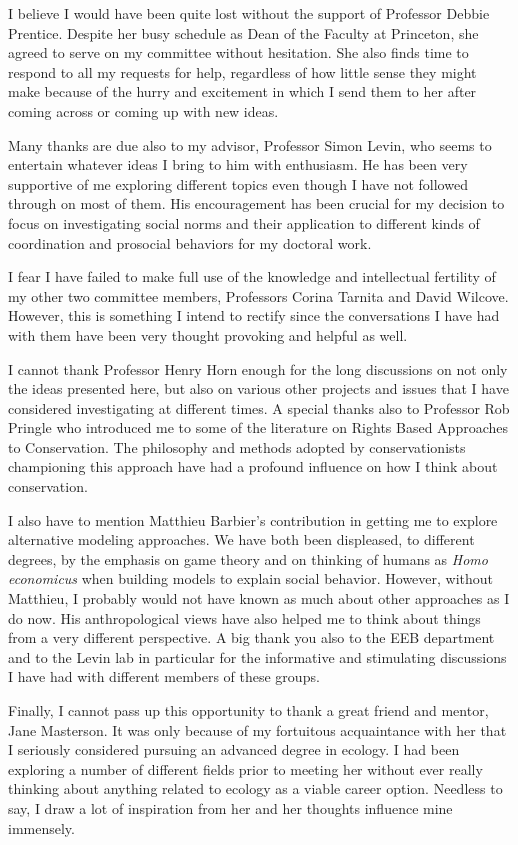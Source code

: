 \documentclass{report}
\begin{document}
I believe I would have been quite lost without the support of Professor Debbie Prentice. Despite her busy schedule as Dean of the Faculty at Princeton, she agreed to serve on my committee without hesitation. She also finds time to respond to all my requests for help, regardless of how little sense they might make because of the hurry and excitement in which I send them to her after coming across or coming up with new ideas.

Many thanks are due also to my advisor, Professor Simon Levin, who seems to entertain whatever ideas I bring to him with enthusiasm. He  has been very supportive of me exploring different topics even though I have not followed through on most of them. His encouragement has been crucial for my decision to focus on investigating social norms and their application to different kinds of coordination and prosocial behaviors for my doctoral work.

I fear I have failed to make full use of the knowledge and intellectual fertility of my other two committee members, Professors Corina Tarnita and David Wilcove. However, this is something I intend to rectify since the conversations I have had with them have been very thought provoking and helpful as well.

I cannot thank Professor Henry Horn enough for the long discussions on not only the ideas presented here, but also on various other projects and issues that I have considered investigating at different times. A special thanks also to Professor Rob Pringle who introduced me to some of the literature on Rights Based Approaches to Conservation. The philosophy and methods adopted by conservationists championing this approach have had a profound influence on how I think about conservation.

I also have to mention Matthieu Barbier's contribution in getting me to explore alternative modeling approaches. We have both been displeased, to different degrees, by the emphasis on game theory and on thinking of humans as \textit{Homo economicus} when building models to explain social behavior. However, without Matthieu, I probably would not have known as much about other approaches as I do now. His anthropological views have also helped me to think about things from a very different perspective. A big thank you also to the EEB department and to the Levin lab in particular for the informative and stimulating discussions I have had with different members of these groups.

Finally, I cannot pass up this opportunity to thank a great friend and mentor, Jane Masterson. It was only because of my fortuitous acquaintance with her that I seriously considered pursuing an advanced degree in ecology. I had been exploring a number of different fields prior to meeting her without ever really thinking about anything related to ecology as a viable career option. Needless to say, I draw a lot of inspiration from her and her thoughts influence mine immensely.

\tableofcontents




\end{document}
